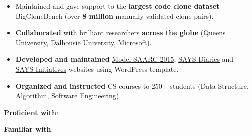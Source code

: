 \documentclass[10pt,a4paper,ragged2e,withhyper]{altacv}
\begin{document}
\begin{paracol}{2}
\begin{itemize}
\item Maintained and gave support to the \textbf{largest code clone dataset} BigCloneBench (over \textbf{8 million} manually validated clone pairs).

\item \textbf{Collaborated} with brilliant researchers \textbf{across the globe} (Queens University,  Dalhousie University, Microsoft).
\end{itemize}

\divider

\begin{itemize}

\item \textbf{Developed and maintained} \href{http://www.says.org.bd/modelsaarc}{\underline{Model SAARC 2015}}, \href{http://says.org.bd/blog/}{\underline{SAYS Diaries}} and\\ \href{http://says.org.bd/initiatives/}{\underline{SAYS Initiatives}} websites using WordPress template. 

\end{itemize}

\divider

\begin{itemize}
\item \textbf{Organized and instructed} CS courses to 250+ students (Data Structure, Algorithm, Software Engineering).
\end{itemize}



\begin{small}
\textbf{Proficient with}:
         \\
\end{small}

\begin{small}
\textbf{Familiar with}:
      \\
\end{small}



\end{paracol}
\end{document}
